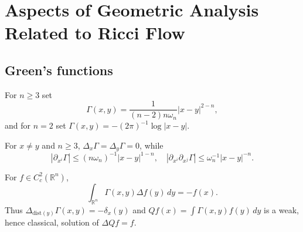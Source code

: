 \chapter{Aspects of Geometric Analysis Related to Ricci Flow}
\label{ch:chow-ii-geometric-analysis}

\section{Green's functions}

\begin{definition}
\label{def:chow-ii-euclidean-green-function}

For $n\ge3$ set
\[
\Gamma(x,y)=\frac{1}{(n-2)n\omega_n}|x-y|^{2-n},
\]
and for $n=2$ set $\Gamma(x,y)=-(2\pi)^{-1}\log|x-y|$.
\end{definition}

\begin{lemma}
\label{lem:chow-ii-euclidean-green-identities}


For $x\ne y$ and $n\ge3$, $\Delta_x\Gamma=\Delta_y\Gamma=0$, while
\[
|\partial_{x^i}\Gamma|\le(n\omega_n)^{-1}|x-y|^{1-n},
\quad |\partial_{x^i}\partial_{x^j}\Gamma|\le\omega_n^{-1}|x-y|^{-n}.
\]
\end{lemma}

\begin{theorem}
\label{thm:chow-ii-euclidean-green-fundamental}


For $f\in C_c^2(\mathbb R^n)$,
\[
\int_{\mathbb R^n}\Gamma(x,y)\Delta f(y)\,dy=-f(x).
\]
Thus $\Delta_{\mathrm{dist}(y)}\Gamma(x,y)=-\delta_x(y)$ and
$Qf(x)=\int\Gamma(x,y)f(y)\,dy$ is a weak, hence classical, solution of
$\Delta Qf=f$.
\end{theorem}

